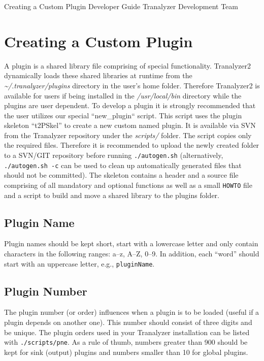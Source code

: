\documentclass[documentation]{subfiles}
\begin{document}
\trantitle
    {Creating a Custom Plugin}
    {Developer Guide} %
    {Tranalyzer Development Team} %

\section{Creating a Custom Plugin}
A plugin is a shared library file comprising of special functionality. Tranalyzer2 dynamically loads these shared libraries at runtime from the {\em \textasciitilde{}/.tranalyzer/plugins} directory in the user's home folder. Therefore Tranalyzer2 is available for users if being installed in the {\em /usr/local/bin} directory while the plugins are user dependent. To develop a plugin it is strongly recommended that the user utilizes our special ``new\_plugin`` script. This script uses the plugin skeleton ``t2PSkel'' to create a new custom named plugin. It is available via SVN from the Tranalyzer repository under the {\em scripts/} folder. The script copies only the required files. Therefore it is recommended to upload the newly created folder to a SVN/GIT repository before running {\tt ./autogen.sh} (alternatively, {\tt ./autogen.sh -c} can be used to clean up automatically generated files that should not be committed). The skeleton contains a header and a source file comprising of all mandatory and optional functions as well as a small {\tt HOWTO} file and a script to build and move a shared library to the plugins folder.

\subsection{Plugin Name}
Plugin names should be kept short, start with a lowercase letter and only contain characters in the following ranges: {a--z, A--Z, 0--9}.
In addition, each ``word'' should start with an uppercase letter, e.g., {\tt pluginName}.

\subsection{Plugin Number}
The plugin number (or order) influences when a plugin is to be loaded (useful if a plugin depends on another one).
This number should consist of three digits and be unique.
The plugin orders used in your Tranalyzer installation can be listed with {\tt ./scripts/pne}.
As a rule of thumb, numbers greater than 900 should be kept for sink (output) plugins and numbers smaller than 10 for global plugins.
\end{document}
